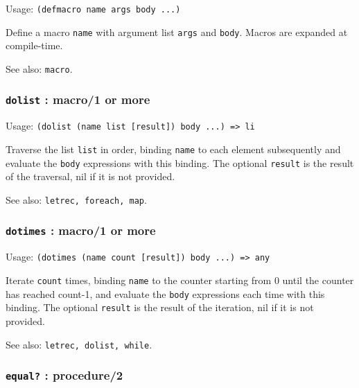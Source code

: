 \documentclass[
]{article}
\newcommand{\passthrough}[1]{#1}
\begin{document}
Usage: \passthrough{\lstinline!(defmacro name args body ...)!}

Define a macro \passthrough{\lstinline!name!} with argument list
\passthrough{\lstinline!args!} and \passthrough{\lstinline!body!}.
Macros are expanded at compile-time.

See also: \passthrough{\lstinline!macro!}.

\hypertarget{dolist-macro1-or-more}{%
\subsubsection{\texorpdfstring{\texttt{dolist} : macro/1 or
more}{dolist : macro/1 or more}}\label{dolist-macro1-or-more}}

Usage:
\passthrough{\lstinline!(dolist (name list [result]) body ...) => li!}

Traverse the list \passthrough{\lstinline!list!} in order, binding
\passthrough{\lstinline!name!} to each element subsequently and evaluate
the \passthrough{\lstinline!body!} expressions with this binding. The
optional \passthrough{\lstinline!result!} is the result of the
traversal, nil if it is not provided.

See also: \passthrough{\lstinline!letrec, foreach, map!}.

\hypertarget{dotimes-macro1-or-more}{%
\subsubsection{\texorpdfstring{\texttt{dotimes} : macro/1 or
more}{dotimes : macro/1 or more}}\label{dotimes-macro1-or-more}}

Usage:
\passthrough{\lstinline!(dotimes (name count [result]) body ...) => any!}

Iterate \passthrough{\lstinline!count!} times, binding
\passthrough{\lstinline!name!} to the counter starting from 0 until the
counter has reached count-1, and evaluate the
\passthrough{\lstinline!body!} expressions each time with this binding.
The optional \passthrough{\lstinline!result!} is the result of the
iteration, nil if it is not provided.

See also: \passthrough{\lstinline!letrec, dolist, while!}.

\hypertarget{equal-procedure2}{%
\subsubsection{\texorpdfstring{\texttt{equal?} :
procedure/2}{equal? : procedure/2}}\label{equal-procedure2}}
\end{document}
